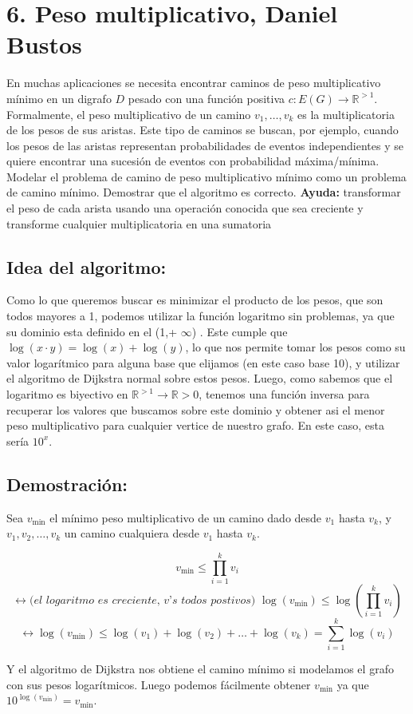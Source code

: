 \documentclass{article}
\begin{document}
\section*{6. Peso multiplicativo, Daniel Bustos} En muchas aplicaciones se necesita encontrar caminos de peso multiplicativo mínimo en un digrafo \( D \) pesado con una función positiva \( c : E(G) \rightarrow \mathbb{R}^{>1} \). Formalmente, el peso multiplicativo de un camino \( v_1, \ldots, v_k \) es la multiplicatoria de los pesos de sus aristas. Este tipo de caminos se buscan, por ejemplo, cuando los pesos de las aristas representan probabilidades de eventos independientes y se quiere encontrar una sucesión de eventos con probabilidad máxima/mínima.
Modelar el problema de camino de peso multiplicativo mínimo como un problema de camino mínimo. Demostrar que el algoritmo es correcto. \textbf{Ayuda:} transformar el peso de cada arista usando una operación conocida que sea creciente y transforme cualquier multiplicatoria en una sumatoria

\subsection*{Idea del algoritmo:}

Como lo que queremos buscar es minimizar el producto de los pesos, que son todos mayores a 1, podemos utilizar la función logaritmo sin problemas, ya que su dominio esta definido en el (1,+ $\infty $) . Este cumple que \( \log(x \cdot y) = \log(x) + \log(y) \), lo que nos permite tomar los pesos como su valor logarítmico para alguna base que elijamos (en este caso base 10), y  utilizar el algoritmo de Dijkstra normal sobre estos pesos. Luego, como sabemos que el logaritmo es biyectivo en \( \mathbb{R}^{>1} \rightarrow \mathbb{R} > 0 \), tenemos una función inversa para recuperar los valores que buscamos sobre este dominio y obtener asi el menor peso multiplicativo para cualquier vertice de nuestro grafo. En este caso, esta sería \( 10^x \).

\subsection*{Demostración:}
Sea \( v_{\text{min}} \) el mínimo peso multiplicativo de un camino dado desde \( v_1 \) hasta \( v_k \), y \( v_1, v_2, \ldots , v_k \) un camino cualquiera desde \( v_1 \) hasta \( v_k \).

\[
v_{\text{min}} \leq \prod_{i = 1}^{k} v_i 
\]
\[
 \leftrightarrow \textit{(el logaritmo es creciente, v's todos postivos) }  \log(v_{\text{min}}) \leq \log\left(\prod_{i = 1}^{k} v_i\right)
\]
\[
\leftrightarrow \log(v_{\text{min}}) \leq \log(v_1) + \log(v_2) + \ldots + \log(v_k) = \sum_{i=1}^{k} \log(v_i) 
\]

Y el algoritmo de Dijkstra nos obtiene el camino mínimo si modelamos el grafo con sus pesos logarítmicos. Luego podemos fácilmente obtener \( v_{\text{min}} \) ya que \( 10^{\log(v_{\text{min}})} = v_{\text{min}} \).
\end{document}
